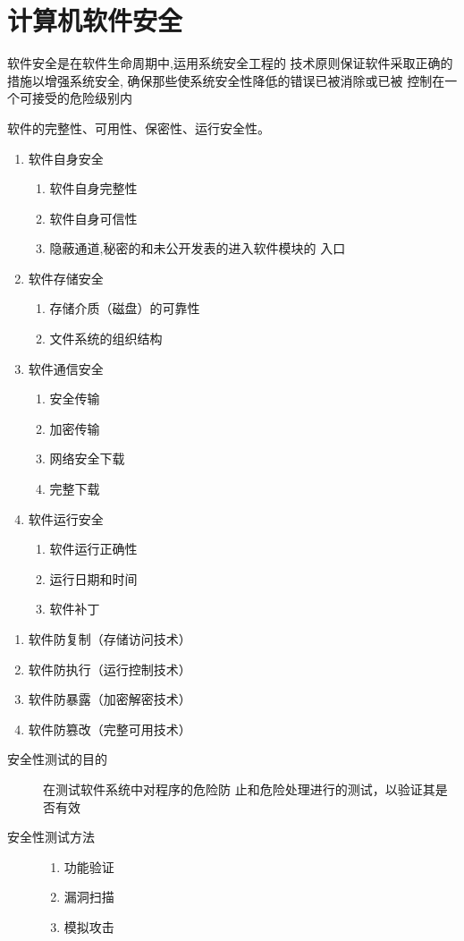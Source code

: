 \chapter{计算机软件安全}
软件安全是在软件生命周期中,运用系统安全工程的
技术原则保证软件采取正确的措施以增强系统安全,
确保那些使系统安全性降低的错误已被消除或已被
控制在一个可接受的危险级别内

软件的完整性、可用性、保密性、运行安全性。

\begin{enumerate}
	\item 软件自身安全
	\begin{enumerate}
		\item 软件自身完整性
		\item 软件自身可信性
		\item 隐蔽通道,秘密的和未公开发表的进入软件模块的
		入口
	\end{enumerate}
	\item 软件存储安全
	\begin{enumerate}
		\item 存储介质（磁盘）的可靠性
		\item 文件系统的组织结构
	\end{enumerate}
	\item 软件通信安全
	\begin{enumerate}
		\item 安全传输
		\item 加密传输
		\item 网络安全下载
		\item 完整下载	
	\end{enumerate}
	\item 软件运行安全
	\begin{enumerate}
		\item 软件运行正确性
		\item 运行日期和时间
		\item 软件补丁
	\end{enumerate}
\end{enumerate}

\begin{enumerate}
	\item 软件防复制（存储访问技术）
	\item 软件防执行（运行控制技术）
	\item 软件防暴露（加密解密技术）
	\item 软件防篡改（完整可用技术）
\end{enumerate}

\begin{description}
	\item[安全性测试的目的] 在测试软件系统中对程序的危险防
	止和危险处理进行的测试，以验证其是否有效
	\item[安全性测试方法]
	\begin{enumerate}
		\item 功能验证
		\item 漏洞扫描
		\item 模拟攻击
	\end{enumerate}
\end{description}


